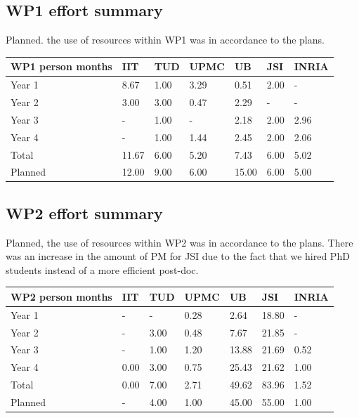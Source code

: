 \documentclass[12pt,a4paper,twoside]{article}
\begin{document}
\subsection{WP1 effort summary}
Planned. the use of resources within WP1 was in accordance to the plans. 

\begin{center}
  \begin{tabular}{|C{1.5cm}|C{1.5cm}|C{1.5cm}|C{2cm}|C{2cm}|C{2cm}|C{2cm}|}
    \hline \footnotesize \textbf{WP1 person months}& \footnotesize
    \textbf{IIT}&\footnotesize \textbf{TUD}&\footnotesize \textbf{UPMC}&
    \footnotesize \textbf{UB} &\footnotesize \textbf{JSI} & \footnotesize \textbf{INRIA}\\
    \hline \footnotesize Year 1  & 8.67  & 1.00 & 3.29 & 0.51 & 2.00 & -\\
    \hline \footnotesize Year 2  & 3.00  & 3.00 & 0.47 & 2.29 & -    & - \\
    \hline \footnotesize Year 3  & -     & 1.00 & -    & 2.18 & 2.00 & 2.96 \\
    \hline \footnotesize Year 4  & -     &  1.00 &  1.44 &  2.45  &  2.00  &  2.06 \\ \hline 
    \footnotesize Total & 11.67 &  6.00 &  5.20 &  7.43 &  6.00 &  5.02    \\  \hline
    \hline \footnotesize Planned & 12.00 & 9.00 & 6.00 & 15.00 & 6.00 & 5.00 \\
    \hline
  \end{tabular}
\end{center}

\subsection{WP2 effort summary}
Planned, the use of resources within WP2 was in accordance to the plans. There was an increase in the amount of PM for JSI due to the fact that we hired PhD students instead of a more efficient post-doc.
\begin{center}
\begin{tabular}{|C{1.5cm}|C{1.5cm}|C{1.5cm}|C{2cm}|C{2cm}|C{2cm}|C{2cm}|}
\hline
\footnotesize \textbf{WP2 person months}& \footnotesize \textbf{IIT}&\footnotesize \textbf{TUD}&\footnotesize \textbf{UPMC}& \footnotesize \textbf{UB} &\footnotesize \textbf{JSI} & \footnotesize \textbf{INRIA} \\ \hline
\footnotesize Year 1  &  -     & -    & 0.28 & 2.64  & 18.80  & -     \\  \hline
\footnotesize Year 2  &  -     & 3.00 & 0.48 & 7.67  & 21.85  & -     \\  \hline
\footnotesize Year 3  &  -     & 1.00 & 1.20 & 13.88 & 21.69  & 0.52  \\  \hline
\footnotesize Year 4  &  0.00  &  3.00 &  0.75 &  25.43 &  21.62 &  1.00  \\  \hline 
\footnotesize Total & 0.00 &  7.00 &  2.71 &  49.62 &  83.96 &  1.52     \\
\hline \hline
\footnotesize Planned & -      & 4.00 & 1.00 & 45.00  & 55.00 & 1.00  \\  \hline
\end{tabular}
\end{center}
\end{document}
